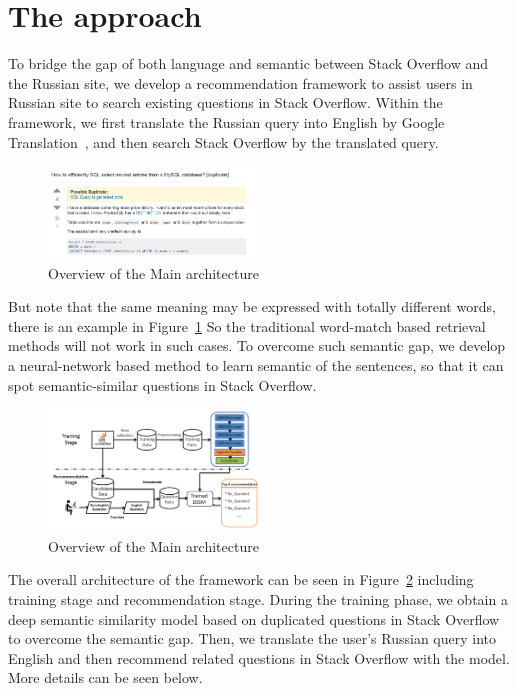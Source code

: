 	\section{The approach}
	
	To bridge the gap of both language and semantic between Stack Overflow and the Russian site, we develop a recommendation framework to assist users in Russian site to search existing questions in Stack Overflow.
	Within the framework, we first translate the Russian query into English by Google Translation~\cite{???}, and then search Stack Overflow by the translated query.
	\begin{figure}[!h]
		\centering
		\includegraphics[width = 0.5\textwidth]{figures/duplicateex.png}
		\caption{Overview of the Main architecture}
		\label{fig:duplicateexample}
	\end{figure}
	But note that the same meaning may be expressed with totally different words, there is an example in Figure~\ref{fig:duplicateexample}
	So the traditional word-match based retrieval methods will not work in such cases.
	To overcome such semantic gap, we develop a neural-network based method to learn semantic of the sentences, so that it can spot semantic-similar questions in Stack Overflow.
	
	\begin{figure}
		\centering
		\includegraphics[width = 0.5\textwidth]{figures/model.png}
		\caption{Overview of the Main architecture}
		\label{fig:method}
	\end{figure}
	
	The overall architecture of the framework can be seen in Figure~\ref{fig:method} including training stage and recommendation stage.
	During the training phase, we obtain a deep semantic similarity model based on duplicated questions in Stack Overflow to overcome the semantic gap.
	Then, we translate the user's Russian query into English and then recommend related questions in Stack Overflow with the model. 
	More details can be seen below.
	

